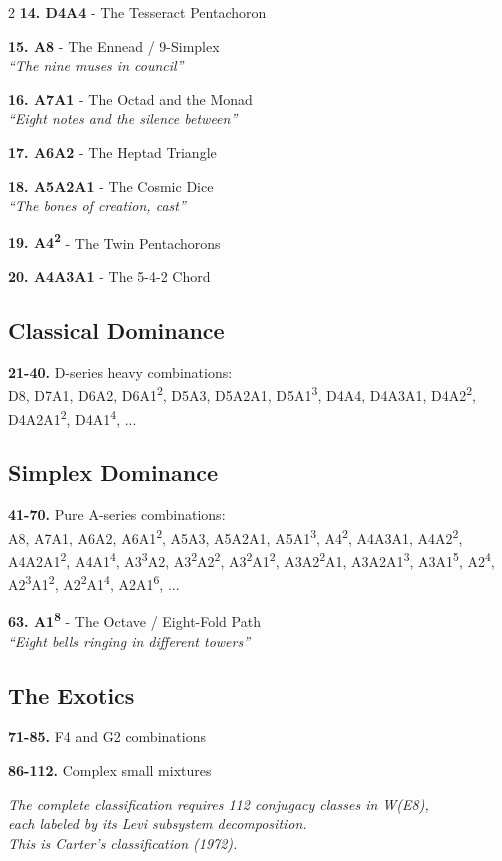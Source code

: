 \documentclass[11pt]{article}
\begin{document}
\begin{multicols}{2}
\textbf{14. D4A4} - The Tesseract Pentachoron

\textbf{15. A8} - The Ennead / 9-Simplex\\
\textit{``The nine muses in council''}

\textbf{16. A7A1} - The Octad and the Monad\\
\textit{``Eight notes and the silence between''}

\textbf{17. A6A2} - The Heptad Triangle

\textbf{18. A5A2A1} - The Cosmic Dice\\
\textit{``The bones of creation, cast''}

\textbf{19. A4\textsuperscript{2}} - The Twin Pentachorons

\textbf{20. A4A3A1} - The 5-4-2 Chord

\subsection*{Classical Dominance}

\textbf{21-40.} D-series heavy combinations:\\
D8, D7A1, D6A2, D6A1\textsuperscript{2}, D5A3, D5A2A1, D5A1\textsuperscript{3}, D4A4, D4A3A1, D4A2\textsuperscript{2}, D4A2A1\textsuperscript{2}, D4A1\textsuperscript{4}, ...

\subsection*{Simplex Dominance}

\textbf{41-70.} Pure A-series combinations:\\
A8, A7A1, A6A2, A6A1\textsuperscript{2}, A5A3, A5A2A1, A5A1\textsuperscript{3}, A4\textsuperscript{2}, A4A3A1, A4A2\textsuperscript{2}, A4A2A1\textsuperscript{2}, A4A1\textsuperscript{4}, A3\textsuperscript{3}A2, A3\textsuperscript{2}A2\textsuperscript{2}, A3\textsuperscript{2}A1\textsuperscript{2}, A3A2\textsuperscript{2}A1, A3A2A1\textsuperscript{3}, A3A1\textsuperscript{5}, A2\textsuperscript{4}, A2\textsuperscript{3}A1\textsuperscript{2}, A2\textsuperscript{2}A1\textsuperscript{4}, A2A1\textsuperscript{6}, ...

\textbf{63. A1\textsuperscript{8}} - The Octave / Eight-Fold Path\\
\textit{``Eight bells ringing in different towers''}

\subsection*{The Exotics}

\textbf{71-85.} F4 and G2 combinations

\textbf{86-112.} Complex small mixtures

\end{multicols}

\vspace{0.5cm}

\begin{center}
\textit{The complete classification requires 112 conjugacy classes in W(E8),\\
each labeled by its Levi subsystem decomposition.\\
This is Carter's classification (1972).}
\end{center}
\end{document}
